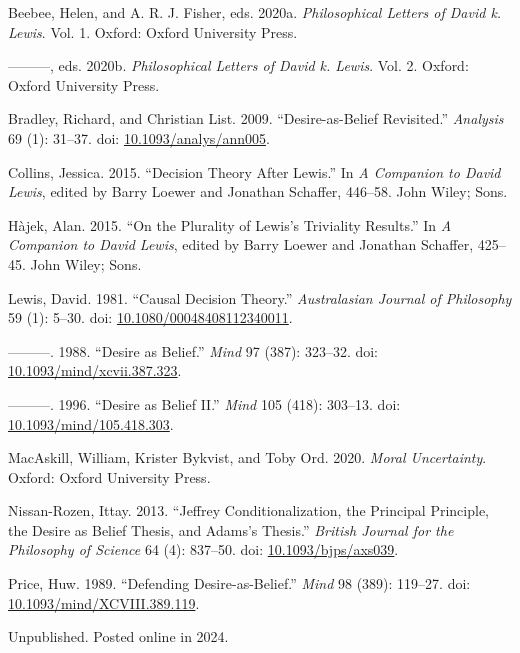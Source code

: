 \documentclass[
  11pt,
  letterpaper,
  DIV=11,
  numbers=noendperiod,
  twoside]{scrartcl}
\newlength{\cslhangindent}
\newenvironment{CSLReferences}[2] %
 {\begin{list}{}{%
  \setlength{\itemindent}{0pt}
  \setlength{\leftmargin}{0pt}
  \setlength{\parsep}{0pt}
  \ifodd #1
   \setlength{\leftmargin}{\cslhangindent}
   \setlength{\itemindent}{-1\cslhangindent}
  \fi
  \setlength{\itemsep}{#2\baselineskip}}}
 {\end{list}}
\begin{document}
\label{refs}
\begin{CSLReferences}{1}{0}
Beebee, Helen, and A. R. J. Fisher, eds. 2020a. \emph{Philosophical
Letters of David k. Lewis}. Vol. 1. Oxford: Oxford University Press.

---------, eds. 2020b. \emph{Philosophical Letters of David k. Lewis}.
Vol. 2. Oxford: Oxford University Press.

Bradley, Richard, and Christian List. 2009. {``Desire-as-Belief
Revisited.''} \emph{Analysis} 69 (1): 31--37. doi:
\href{https://doi.org/10.1093/analys/ann005}{10.1093/analys/ann005}.

Collins, Jessica. 2015. {``Decision Theory After Lewis.''} In \emph{A
Companion to David Lewis}, edited by Barry Loewer and Jonathan Schaffer,
446--58. John Wiley; Sons.

Hàjek, Alan. 2015. {``On the Plurality of Lewis's Triviality Results.''}
In \emph{A Companion to David Lewis}, edited by Barry Loewer and
Jonathan Schaffer, 425--45. John Wiley; Sons.

Lewis, David. 1981. {``Causal Decision Theory.''} \emph{Australasian
Journal of Philosophy} 59 (1): 5--30. doi:
\href{https://doi.org/10.1080/00048408112340011}{10.1080/00048408112340011}.

---------. 1988. {``Desire as Belief.''} \emph{Mind} 97 (387): 323--32.
doi:
\href{https://doi.org/10.1093/mind/xcvii.387.323}{10.1093/mind/xcvii.387.323}.

---------. 1996. {``Desire as Belief {II}.''} \emph{Mind} 105 (418):
303--13. doi:
\href{https://doi.org/10.1093/mind/105.418.303}{10.1093/mind/105.418.303}.

MacAskill, William, Krister Bykvist, and Toby Ord. 2020. \emph{Moral
Uncertainty}. Oxford: {O}xford {U}niversity {P}ress.

Nissan-Rozen, Ittay. 2013. {``Jeffrey Conditionalization, the Principal
Principle, the Desire as Belief Thesis, and Adams's Thesis.''}
\emph{British Journal for the Philosophy of Science} 64 (4): 837--50.
doi: \href{https://doi.org/10.1093/bjps/axs039}{10.1093/bjps/axs039}.

Price, Huw. 1989. {``Defending Desire-as-Belief.''} \emph{Mind} 98
(389): 119--27. doi:
\href{https://doi.org/10.1093/mind/XCVIII.389.119}{10.1093/mind/XCVIII.389.119}.

\end{CSLReferences}



\noindent Unpublished. Posted online in 2024.
\end{document}
